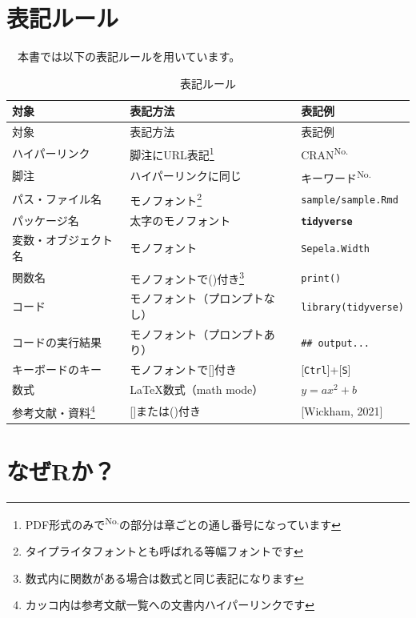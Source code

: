 \documentclass[
  12pt,
]{book}
\begin{document}
\newpage

\hypertarget{ux8868ux8a18ux30ebux30fcux30eb}{%
\section*{表記ルール}\label{ux8868ux8a18ux30ebux30fcux30eb}}

　本書では以下の表記ルールを用いています。

\begin{longtable}[]{@{}lll@{}}
\caption{表記ルール}\tabularnewline
\toprule
対象 & 表記方法 & 表記例 \\
\midrule
\endfirsthead
\toprule
対象 & 表記方法 & 表記例 \\
\midrule
\endhead
ハイパーリンク & 脚注にURL表記\footnote{PDF形式のみで\textsuperscript{No.}の部分は章ごとの通し番号になっています} & CRAN\textsuperscript{No.} \\
脚注 & ハイパーリンクに同じ & キーワード\textsuperscript{No.} \\
パス・ファイル名 & モノフォント\footnote{タイプライタフォントとも呼ばれる等幅フォントです} & \texttt{sample/sample.Rmd} \\
パッケージ名 & 太字のモノフォント & \textbf{\texttt{tidyverse}} \\
変数・オブジェクト名 & モノフォント & \texttt{Sepela.Width} \\
関数名 & モノフォントで()付き\footnote{数式内に関数がある場合は数式と同じ表記になります} & \texttt{print()} \\
コード & モノフォント（プロンプトなし） & \texttt{library(tidyverse)} \\
コードの実行結果 & モノフォント（プロンプトあり） & \texttt{\#\#\ output...} \\
キーボードのキー & モノフォントで{[}{]}付き & {[}\texttt{Ctrl}{]}+{[}\texttt{S}{]} \\
数式 & \LaTeX 数式（math mode） & \(y = ax^2 + b\) \\
参考文献・資料\footnote{カッコ内は参考文献一覧への文書内ハイパーリンクです} & {[}{]}または()付き & {[}Wickham, 2021{]} \\
\bottomrule
\end{longtable}

\hypertarget{ux306aux305crux304b}{%
\section*{なぜRか？}\label{ux306aux305crux304b}}
\end{document}
